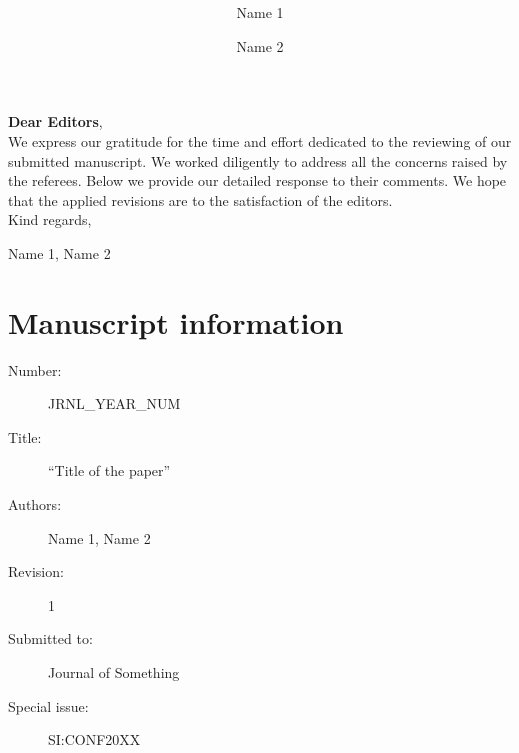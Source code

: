 \documentclass{article}
\author[1]{Name 1}
\author[2]{Name 2}
\affil[1]{University 1, City 1, Country 1}
\affil[2]{University 3, City 2, Country 2}
\date{}
\title{\textbf{\PaperTitle}}
\def\PaperTitle{Title of the paper}
\def\PaperId{{JRNL\_YEAR\_NUM}}
\def\PaperRevision{1}
\def\SpecialIssueId{{SI:CONF20XX}}
\def\Journal{{Journal of Something}}
\def\Authors{Name 1, Name 2}
\begin{document}
  
  \maketitle
  
  \noindent \textbf{Dear Editors},
  \\[2em]
  \indent We express our gratitude for the time and effort dedicated to the reviewing of our submitted manuscript.
  We worked diligently to address all the concerns raised by the referees.
  Below we provide our detailed response to their comments.
  We hope that the applied revisions are to the satisfaction of the editors.
  \\[2em]
  Kind regards,
  \begin{flushright}
    \Authors
  \end{flushright}
  \vfill
  \section*{Manuscript information}
  \begin{description}
    \item[Number:] \PaperId
    \item[Title:] ``\PaperTitle''
    \item[Authors:] \Authors
    \item[Revision:] \PaperRevision
    \item[Submitted to:] \Journal
    \item[Special issue:] \SpecialIssueId
  \end{description}
  \pagebreak
  
  {
    \hypersetup{linkcolor=black}
    \tableofcontents
    \pagebreak
  }

  
  
  
\end{document}
